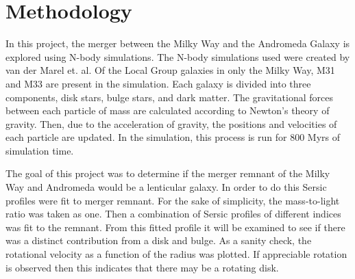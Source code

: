 \documentclass[fleqn,usenatbib]{mnras}
\begin{document}


\section{Methodology}
In this project, the merger between the Milky Way and the Andromeda Galaxy is explored using N-body simulations. The N-body simulations used were created by van der Marel et. al. \cite{van_der_Marel_2012_1,van_der_Marel_2012_2} Of the Local Group galaxies in only the Milky Way, M31 and M33 are present in the simulation. Each galaxy is divided into three components, disk stars, bulge stars, and dark matter. The gravitational forces between each particle of mass are calculated according to Newton's theory of gravity. Then, due to the acceleration of gravity, the positions and velocities of each particle are updated.  In the simulation, this process is run for 800 Myrs of simulation time.

The goal of this project was to determine if the merger remnant of the Milky Way and Andromeda would be a lenticular galaxy. In order to do this Sersic profiles were fit to merger remnant. For the sake of simplicity, the mass-to-light ratio was taken as one. Then a combination of Sersic profiles of different indices was fit to the remnant. From this fitted profile it will be examined to see if there was a distinct contribution from a disk and bulge. As a sanity check, the rotational velocity as a function of the radius was plotted. If appreciable rotation is observed then this indicates that there may be a rotating disk. 
\end{document}
